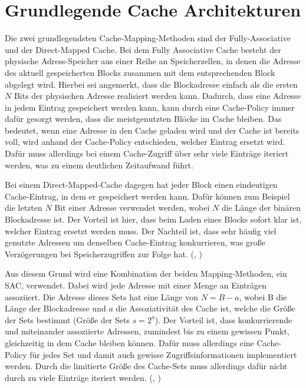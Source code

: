 \section{Grundlegende Cache Architekturen}
\label{appendix:basic-cache-arch}
Die zwei grundlegendsten Cache-Mapping-Methoden sind der
Fully-Associative und der Direct-Mapped Cache. Bei dem Fully
Associative Cache besteht der physische Adress-Speicher aus einer
Reihe an Speicherzellen, in denen die Adresse des aktuell gespeicherten
Blocks zusammen mit dem entsprechenden Block abgelegt wird.
Hierbei sei angemerkt, dass die Blockadresse einfach als die
ersten $N$ Bits der physischen Adresse realisiert werden kann.
Dadurch, dass eine Adresse in jedem Eintrag gespeichert werden kann,
kann durch eine Cache-Policy immer dafür gesorgt werden, dass
die meistgenutzten Blöcke im Cache bleiben. Das bedeutet, wenn
eine Adresse in den Cache geladen wird und der Cache ist bereits
voll, wird anhand der Cache-Policy entschieden, welcher Eintrag
ersetzt wird. Dafür muss allerdings bei einem Cache-Zugriff
über sehr viele Einträge iteriert werden, was zu einem
deutlichen Zeitaufwand führt.

Bei einem Direct-Mapped-Cache dagegen hat jeder Block einen
eindeutigen Cache-Eintrag, in dem er gespeichert werden kann.
Dafür können zum Beispiel die letzten $N$ Bit einer Adresse
verwendet werden, wobei $N$ die Länge der binären Blockadresse
ist. Der Vorteil ist hier, dass beim Laden eines Blocks sofort
klar ist, welcher Eintrag ersetzt werden muss. Der Nachteil ist,
dass sehr häufig viel genutzte Adressen um denselben Cache-Eintrag
konkurrieren, was große Verzögerungen bei Speicherzugriffen
zur Folge hat.
(\cite[518-521]{sarangi_basic_2021}, \cite[16-18]{handy_cache_1993})

Aus diesem Grund wird eine Kombination der beiden
Mapping-Methoden, ein \ac{SAC}, verwendet. Dabei wird jede Adresse
mit einer Menge an Einträgen assoziiert. Die Adresse dieses Sets
hat eine Länge von $N = B - a$, wobei B die Länge der Blockadresse
und $a$ die Assoziativität des Cache ist, welche die
Größe der Sets bestimmt (Größe der Sets $s=2^a$). Der Vorteil
ist, dass konkurrierende und miteinander assoziierte Adressen,
zumindest bis zu einem gewissen Punkt, gleichzeitig in dem Cache
bleiben können. Dafür muss allerdings eine Cache-Policy für jedes
Set und damit auch gewisse Zugriffsinformationen implementiert
werden. Durch die limitierte Größe des Cache-Sets muss allerdings
dafür nicht durch zu viele Einträge iteriert werden.
(\cite[522-524]{sarangi_basic_2021}, \cite[18,19]{handy_cache_1993})

